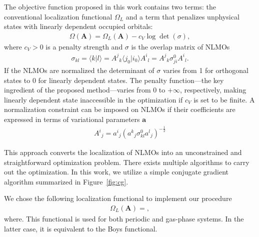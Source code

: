 \documentclass[aps,prl,reprint,amsmath,amssymb]{revtex4-1}
\newcommand{\ket}[1]{\ensuremath{\vert #1 \rangle}}
\newcommand{\braket}[2]{\ensuremath{\langle #1 \vert #2 \rangle}} %
\begin{document}
The objective function proposed in this work contains two terms: the conventional localization functional $\Omega_L$ and a term that penalizes unphysical states with linearly dependent occupied orbitals:
%
\begin{equation}
\begin{split}
\Omega(\mathbf{A}) = \Omega_L(\mathbf{A}) - c_V \log \det (\sigma),
\end{split}
\end{equation}
%
where $c_V > 0$ is a penalty strength and $\sigma$ is the overlap matrix of NLMOs 
%
\begin{equation}
\begin{split}
\sigma_{kl} = \braket{k}{l} = {A^j}_k \braket{j_0}{i_0}{A^i}_l = {A^j}_k \sigma_{ji}^0{A^i}_l .
\end{split}
\end{equation}
%
%
If the NLMOs are normalized the determinant of $\sigma$ varies from 1 for orthogonal states to 0 for linearly dependent states. The penalty function---the key ingredient of the proposed method---varies from 0 to $+\infty$, respectively, making linearly dependent state inaccessible in the optimization if $c_V$ is set to be finite. A normalization constraint can be imposed on NLMOs if their coefficients are expressed in terms of variational parameters $\mathbf{a}$
%
\begin{equation}
\begin{split}
{A^i}_j = {a^i}_{j} ({a^k}_{j} \sigma^0_{kl}{a^l}_{j})^{-\frac{1}{2}}
\end{split}
\end{equation}

This approach converts the localization of NLMOs into an unconstrained and straightforward optimization problem. There exists multiple algorithms to carry out the optimization. In this work, we utilize a simple conjugate gradient algorithm summarized in Figure~\ref{fig:cg}.

We chose the following localization functional to implement our procedure 
%
\begin{equation}
\begin{split}
\Omega_L(\mathbf{A}) =,
\end{split}
\end{equation}
%
where. This functional is used for both periodic and gas-phase systems. In the latter case, it is equivalent to the Boys functional.
\end{document}
